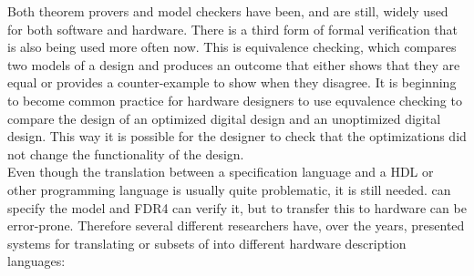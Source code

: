 


Both theorem provers and model checkers have been, and are still, widely used for both software and hardware. There is a third form of formal verification that is also being used more often now. This is equivalence checking, which compares two models of a design and produces an outcome that either shows that they are equal or provides a counter-example to show when they disagree. It is beginning to become common practice for hardware designers to use equvalence checking to compare the design of an optimized digital design and an unoptimized digital design. This way it is possible for the designer to check that the optimizations did not change the functionality of the design.\\

Even though the translation between a specification language and a HDL or other programming language is usually quite problematic, it is still needed.
\cspm can specify the model and FDR4 can verify it, but to transfer this to hardware can be error-prone. Therefore several different researchers have,  over the years, presented systems for translating \cspm{} or subsets of \cspm{} into different hardware description languages:\\

